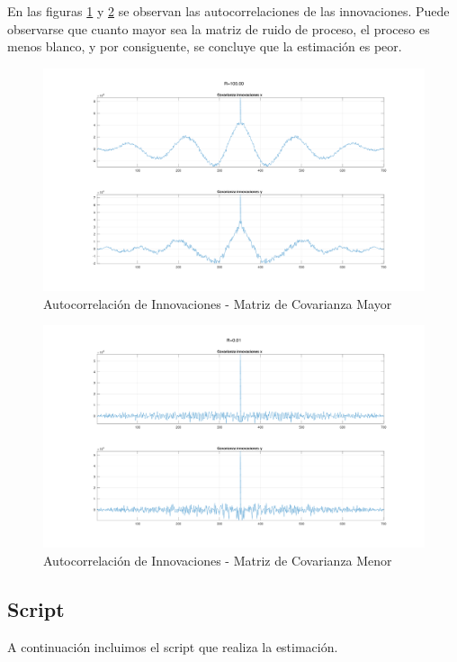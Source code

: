 	En las figuras \ref{fig:ej5r1_innov} y \ref{fig:ej5r2_innov} se observan las autocorrelaciones de las innovaciones. Puede observarse que cuanto mayor sea la matriz de ruido de proceso, el proceso es menos blanco, y por consiguente, se concluye que la estimación es peor.
	
	\begin{figure}[H]
		\centering
		\includegraphics[width=1.0\textwidth,keepaspectratio]{Figuras/covinn_ej6_R1.pdf}
		\caption{Autocorrelación de Innovaciones - Matriz de Covarianza Mayor}
		\label{fig:ej5r1_innov}
	\end{figure}
	
	\begin{figure}[H]
		\centering
		\includegraphics[width=1.0\textwidth,keepaspectratio]{Figuras/covinn_ej6_R2.pdf}
		\caption{Autocorrelación de Innovaciones - Matriz de Covarianza Menor}
		\label{fig:ej5r2_innov}
	\end{figure}
	

\subsection{Script}

	A continuación incluimos el script que realiza la estimación.
	
